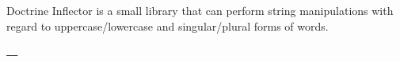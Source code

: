 Doctrine Inflector is a small library that can perform string manipulations with regard to uppercase/lowercase and singular/plural forms of words.

\href{https://github.com/doctrine/inflector/actions?query=workflow\%3A\%22Continuous+Integration\%22+branch\%3A4.0.x}{\texttt{ }} \href{https://codecov.io/gh/doctrine/inflector/branch/2.0.x}{\texttt{ }} 